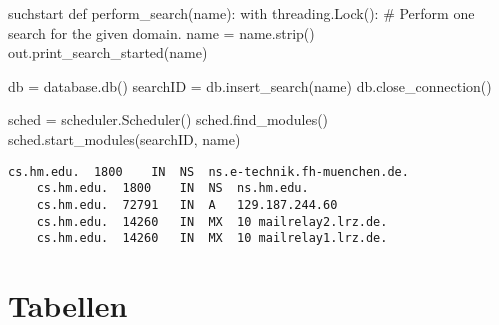 \begin{python}{suchstart}
def perform_search(name):
    with threading.Lock():
        # Perform one search for the given domain.
        name = name.strip()
        out.print_search_started(name)
    
        db = database.db()
        searchID = db.insert_search(name)
        db.close_connection()
    
        sched = scheduler.Scheduler()
        sched.find_modules()
        sched.start_modules(searchID, name)
\end{python}

\vspace{6mm}
\begin{lstlisting}[caption=DNS Auflösung von cs.hm.edu, label=lst.dnsDig, ]
	cs.hm.edu.	1800	IN	NS	ns.e-technik.fh-muenchen.de.
	cs.hm.edu.	1800	IN	NS	ns.hm.edu.
	cs.hm.edu.	72791	IN	A   129.187.244.60
	cs.hm.edu.	14260	IN	MX	10 mailrelay2.lrz.de.
	cs.hm.edu.	14260	IN	MX	10 mailrelay1.lrz.de.
\end{lstlisting}








\chapter{Tabellen}

